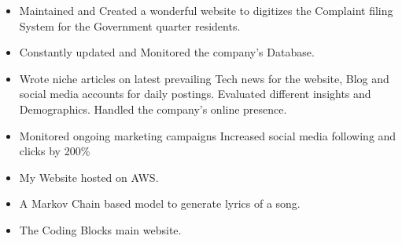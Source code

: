 \documentclass[10pt,a4paper,ragged2e]{altacv}
\begin{document}
\begin{itemize}
\item Maintained and Created a wonderful website to digitizes the Complaint filing System for the Government quarter residents. 
\item Constantly updated and Monitored the company’s Database.

\end{itemize}



\begin{itemize}
\item Wrote niche articles on latest prevailing Tech news for the website, Blog and social media accounts for daily postings.
Evaluated different insights and Demographics. Handled the company’s online presence.
 \item Monitored ongoing marketing campaigns
Increased social media following and clicks by 200\%

\end{itemize}


\begin{itemize}
\item My Website hosted on AWS.
\end{itemize}

\begin{itemize}
\item A Markov Chain based model to generate lyrics of a song. 
\end{itemize}


\begin{itemize}
\item The Coding Blocks main website.
\end{itemize}
\end{document}
